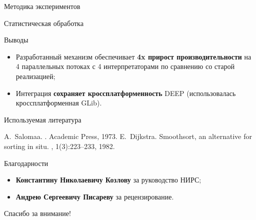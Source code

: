 \documentclass{beamer}
\begin{document}
\begin{frame}{Методика экспериментов}
\end{frame}

\begin{frame}{Статистическая обработка}
\end{frame}

\begin{frame}{Выводы}
\begin{itemize}
    \itemsep 2em
    \item Разработанный механизм обеспечивает
        \textbf{4x прирост производительности}
        на 4 параллельных потоках с 4 интерпретаторами по
        сравнению со старой реализацией;
    \item Интеграция \textbf{сохраняет кроссплатформенность} DEEP
        (использовалась кроссплатформенная GLib).
\end{itemize}
\end{frame}

\begin{frame}{Используемая литература}
\begin{thebibliography}{Dijkstra, 1982}
        A.~Salomaa.
        .
        \newblock Academic Press, 1973.
        E.~Dijkstra.
        \newblock Smoothsort, an alternative for sorting in situ.
        , 1(3):223--233, 1982.
\end{thebibliography}
\end{frame}

\begin{frame}{Благодарности}
    \begin{itemize}
        \itemsep 2em
        \item \textbf{Константину Николаевичу Козлову}
            за руководство НИРС;
        \item \textbf{Андрею Сергеевичу Писареву}
            за рецензирование.
    \end{itemize}
    \bigskip

    \vfill
    \begin{center}
        \LARGE Спасибо за внимание!
    \end{center}
\end{frame}
\end{document}
